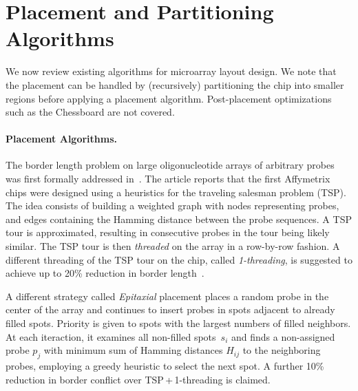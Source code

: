 \documentclass[english]{lni}
\newcommand{\ignore}[1]{}
\begin{document}
\section{Placement and Partitioning Algorithms}
\label{sec:previous_work}

We now review existing algorithms for microarray layout design. We note that
the placement can be handled by (recursively) partitioning the chip into smaller
regions before applying a placement algorithm. Post-placement optimizations such
as the Chessboard \cite{KAHNG02} are not covered.

\ignore{The first to formally address the border length problem were
\cite{FELDMAN93}. They showed how an optimal placement can be constructed based
on a two-dimensional Gray code. However, their work is restricted to
\emph{uniform arrays} (arrays containing all possible probes of a given length)
and synchronous embeddings.}

\paragraph{Placement Algorithms.}
The border length problem on large oligonucleotide arrays of arbitrary probes
was first formally addressed in~\cite{HANNENHALLI02}. The article reports that
the first Affymetrix chips were designed using a heuristics for the traveling
salesman problem (TSP). The idea consists of building a weighted graph with
nodes representing probes, and edges containing the Hamming distance between
the probe sequences. A TSP tour is approximated, resulting in consecutive
probes in the tour being likely similar. The TSP tour is then
\emph{threaded} on the array in a row-by-row fashion. A different threading of
the TSP tour on the chip, called \emph{1-threading}, is suggested to achieve
up to 20\% reduction in border length~\cite{HANNENHALLI02}.

A different strategy called \emph{Epitaxial} placement
\cite{KAHNG02} places a random probe in the center of the array and continues
to insert probes in spots adjacent to already filled spots. Priority is given
to spots with the largest numbers of filled neighbors. At each iteraction, it
examines all non-filled spots~$s_i$ and finds a non-assigned probe $p_j$ with
minimum sum of Hamming distances $H_{ij}$ to the neighboring probes, employing
a greedy heuristic to select the next spot.  A further 10\% reduction in
border conflict over TSP\,+\,1-threading is claimed.
\end{document}
